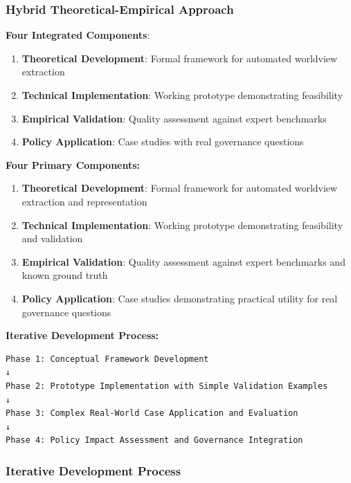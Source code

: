 \documentclass[
  11pt,
  letterpaper,
]{book}
\providecommand{\tightlist}{%
  \setlength{\itemsep}{0pt}\setlength{\parskip}{0pt}}
\begin{document}
\subsubsection{Hybrid Theoretical-Empirical
Approach}\label{sec-hybrid-approach}

\textbf{Four Integrated Components}:

\begin{enumerate}
\def\labelenumi{\arabic{enumi}.}
\tightlist
\item
  \textbf{Theoretical Development}: Formal framework for automated
  worldview extraction
\item
  \textbf{Technical Implementation}: Working prototype demonstrating
  feasibility
\item
  \textbf{Empirical Validation}: Quality assessment against expert
  benchmarks
\item
  \textbf{Policy Application}: Case studies with real governance
  questions
\end{enumerate}

\textbf{Four Primary Components:}

\begin{enumerate}
\def\labelenumi{\arabic{enumi}.}
\tightlist
\item
  \textbf{Theoretical Development}: Formal framework for automated
  worldview extraction and representation
\item
  \textbf{Technical Implementation}: Working prototype demonstrating
  feasibility and validation
\item
  \textbf{Empirical Validation}: Quality assessment against expert
  benchmarks and known ground truth
\item
  \textbf{Policy Application}: Case studies demonstrating practical
  utility for real governance questions
\end{enumerate}

\textbf{Iterative Development Process:}

\begin{verbatim}
Phase 1: Conceptual Framework Development
↓
Phase 2: Prototype Implementation with Simple Validation Examples  
↓
Phase 3: Complex Real-World Case Application and Evaluation
↓
Phase 4: Policy Impact Assessment and Governance Integration
\end{verbatim}

\subsubsection{Iterative Development
Process}\label{sec-iterative-process}
\end{document}
